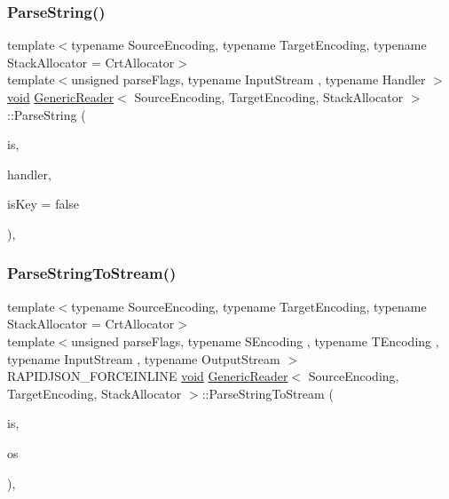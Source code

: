 \subsubsection{\texorpdfstring{Parse\+String()}{ParseString()}}
{\footnotesize\ttfamily template$<$typename Source\+Encoding, typename Target\+Encoding, typename Stack\+Allocator = Crt\+Allocator$>$ \\
template$<$unsigned parse\+Flags, typename Input\+Stream , typename Handler $>$ \\
\hyperlink{imgui__impl__opengl3__loader_8h_ac668e7cffd9e2e9cfee428b9b2f34fa7}{void} \hyperlink{classGenericReader}{Generic\+Reader}$<$ Source\+Encoding, Target\+Encoding, Stack\+Allocator $>$\+::Parse\+String (\begin{DoxyParamCaption}\item[{Input\+Stream \&}]{is,  }\item[{Handler \&}]{handler,  }\item[{bool}]{is\+Key = {\ttfamily false} }\end{DoxyParamCaption})\hspace{0.3cm}{\ttfamily [inline]}, {\ttfamily [private]}}

\mbox{\label{classGenericReader_a8fa22aded7085b3fe5f9d59467318f8a}} 
\subsubsection{\texorpdfstring{Parse\+String\+To\+Stream()}{ParseStringToStream()}}
{\footnotesize\ttfamily template$<$typename Source\+Encoding, typename Target\+Encoding, typename Stack\+Allocator = Crt\+Allocator$>$ \\
template$<$unsigned parse\+Flags, typename S\+Encoding , typename T\+Encoding , typename Input\+Stream , typename Output\+Stream $>$ \\
R\+A\+P\+I\+D\+J\+S\+O\+N\+\_\+\+F\+O\+R\+C\+E\+I\+N\+L\+I\+NE \hyperlink{imgui__impl__opengl3__loader_8h_ac668e7cffd9e2e9cfee428b9b2f34fa7}{void} \hyperlink{classGenericReader}{Generic\+Reader}$<$ Source\+Encoding, Target\+Encoding, Stack\+Allocator $>$\+::Parse\+String\+To\+Stream (\begin{DoxyParamCaption}\item[{Input\+Stream \&}]{is,  }\item[{Output\+Stream \&}]{os }\end{DoxyParamCaption})\hspace{0.3cm}{\ttfamily [inline]}, {\ttfamily [private]}}

